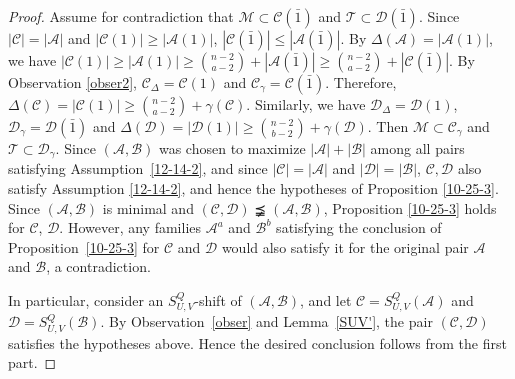 \documentclass[11pt]{article}
\newcommand{\m}{\mathcal}
\begin{document}
\begin{proof}
Assume for contradiction that $\mathcal{M}\subset \mathcal{C}(\bar1)$ and $\mathcal{T}\subset\mathcal{D}(\bar1)$.
Since $|\mathcal{C}|= |\mathcal{A}|$ and $|\m C(1)|\ge |\m A(1)|$, $|\m C(\bar1)|\le |\m A(\bar1)|$.
By $\Delta(\m A)=|\m A(1)|$, we have $|\m C(1)|\ge |\m A(1)|\ge {n-2\choose a-2}+|\m A(\bar1)|\ge {n-2\choose a-2}+|\m C(\bar1)|$.
By Observation \ref{obser2}, $\m C_{\Delta}=\m C(1)$ and $\m C_{\gamma}=\m C(\bar1)$.
Therefore, $\Delta(\m C)=|\m C(1)|\ge {n-2\choose a-2}+\gamma(\m C)$.
Similarly, we have $\m D_{\Delta}=\m D(1)$, $\m D_{\gamma}=\m D(\bar1)$ and $\Delta(\m D)=|\m D(1)|\ge {n-2\choose b-2}+\gamma(\m D)$. 
Then $\mathcal{M}\subset \mathcal{C}_{\gamma}$ and $\mathcal{T}\subset\mathcal{D}_{\gamma}$.
Since $(\mathcal A,\mathcal B)$ was chosen to maximize $|\mathcal A|+|\mathcal B|$ among all pairs satisfying
Assumption~\ref{12-14-2}, 
and since $|\mathcal{C}|= |\mathcal{A}|$ and $|\mathcal{D}|= |\mathcal{B}|$,
$\mathcal{C}, \mathcal{D}$ also satisfy Assumption \ref{12-14-2}, and hence the hypotheses of Proposition \ref{10-25-3}. 
Since $(\mathcal{A}, \mathcal{B})$ is minimal and $(\mathcal{C}, \mathcal{D})\precneqq (\mathcal{A},\mathcal{B})$, Proposition \ref{10-25-3} holds for $\mathcal{C}$, $\mathcal{D}$. 
However, any families $\mathcal{A}^a$ and $\mathcal{B}^b$ satisfying the conclusion of Proposition~\ref{10-25-3} for $\mathcal{C}$ and $\mathcal{D}$ would also satisfy it for the original pair $\mathcal{A}$ and $\mathcal{B}$, a contradiction.

In particular, 
consider an $S_{U,V}^Q$-shift of $(\m A, \m B)$, and 
let
$
\mathcal C=S_{U,V}^Q(\mathcal A)$ and $
\mathcal D=S_{U,V}^Q(\mathcal B).
$
By Observation~\ref{obser} and Lemma~\ref{SUV'},
the pair
$(\mathcal C,\mathcal D)$
satisfies the hypotheses above.
Hence the desired conclusion follows from the first part.
\end{proof}
\end{document}
